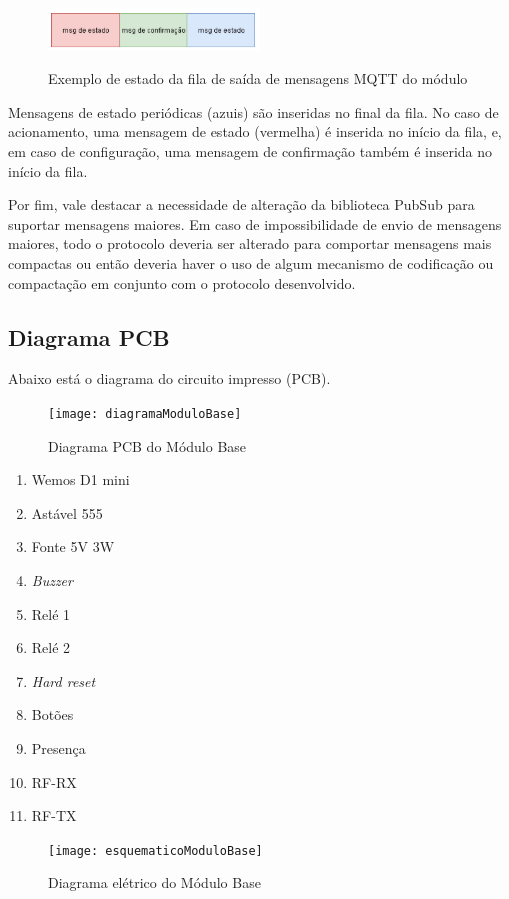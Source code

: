 \begin{figure}[H]
	\centering
	\caption{Exemplo de estado da fila de saída de mensagens MQTT do módulo}
	\includegraphics[width=0.5\textwidth]{filasaidaMQTT}
	\label{fig:filasaidaMQTT}
\end{figure}

Mensagens de estado periódicas (azuis) são inseridas no final da fila. No caso de acionamento, uma mensagem de estado (vermelha) é inserida no início da fila, e, em caso de configuração, uma mensagem de confirmação também é inserida no início da fila.

Por fim, vale destacar a necessidade de alteração da biblioteca PubSub \cite{PubSub} para suportar mensagens maiores. Em caso de impossibilidade de envio de mensagens maiores, todo o protocolo deveria ser alterado para comportar mensagens mais compactas ou então deveria haver o uso de algum mecanismo de codificação ou compactação em conjunto com o protocolo desenvolvido.

\subsection{Diagrama PCB}
Abaixo está o diagrama do circuito impresso (PCB).

\begin{figure}[H]
	\centering
	\caption{Diagrama PCB do Módulo Base}
  \texttt{[image: diagramaModuloBase]}
\label{fig:diagramaModuloBase}
\end{figure}

\begin{enumerate}
\item Wemos D1 mini
\item Astável 555
\item Fonte 5V 3W
\item \textit{Buzzer}
\item Relé 1
\item Relé 2
\item \emph{Hard reset}
\item Botões
\item Presença
\item RF-RX
\item RF-TX
\end{enumerate}

\begin{figure}[H]
	\centering
	\caption{Diagrama elétrico do Módulo Base}
  \texttt{[image: esquematicoModuloBase]}
\label{fig:esquematicoModuloBase}
\end{figure}

